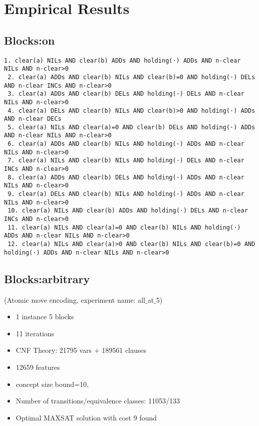 \documentclass[a4paper]{article}
\begin{document}
\section{Empirical Results}



\subsection{Blocks:on}
\begin{Verbatim}[fontsize=\footnotesize]
 1. clear(a) NILs AND clear(b) ADDs AND holding(·) ADDs AND n-clear NILs AND n-clear>0
 2. clear(a) ADDs AND clear(b) NILs AND clear(b)=0 AND holding(·) DELs AND n-clear INCs AND n-clear>0
 3. clear(a) ADDs AND clear(b) DELs AND holding(·) DELs AND n-clear NILs AND n-clear>0
 4. clear(a) DELs AND clear(b) NILs AND clear(b)>0 AND holding(·) ADDs AND n-clear DECs
 5. clear(a) NILs AND clear(a)=0 AND clear(b) DELs AND holding(·) ADDs AND n-clear NILs AND n-clear>0
 6. clear(a) ADDs AND clear(b) NILs AND holding(·) ADDs AND n-clear NILs AND n-clear>0
 7. clear(a) NILs AND clear(b) NILs AND holding(·) DELs AND n-clear INCs AND n-clear>0
 8. clear(a) ADDs AND clear(b) DELs AND holding(·) ADDs AND n-clear NILs AND n-clear>0
 9. clear(a) DELs AND clear(b) NILs AND holding(·) ADDs AND n-clear NILs AND n-clear>0
 10. clear(a) NILs AND clear(b) ADDs AND holding(·) DELs AND n-clear INCs AND n-clear>0
 11. clear(a) NILs AND clear(a)=0 AND clear(b) NILs AND holding(·) ADDs AND n-clear NILs AND n-clear>0
 12. clear(a) NILs AND clear(a)>0 AND clear(b) NILs AND clear(b)=0 AND holding(·) ADDs AND n-clear NILs AND n-clear>0
\end{Verbatim}

\subsection{Blocks:arbitrary}
(Atomic move encoding, experiment name: all$\_$at$\_$5)

\begin{itemize}
 \item 1 instance 5 blocks
 \item 11 iterations
 \item CNF Theory: 21795 vars + 189561 clauses
 \item 12659 features
 \item concept size bound=10,
 \item Number of transitions/equivalence classes: 11053/133
 \item Optimal MAXSAT solution with cost 9 found
\end{itemize}
\end{document}
